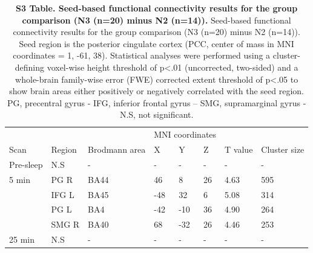 \begin{table}[htbp]
    \caption*{\textbf{S3 Table. Seed-based functional connectivity results for the group comparison (N3 (n=20) minus N2 (n=14)).} Seed-based functional connectivity results for the group comparison (N3 (n=20) minus N2 (n=14)). Seed region is the posterior cingulate cortex (PCC, center of mass in MNI coordinates = 1, -61, 38). Statistical analyses were performed using a cluster-defining voxel-wise height threshold of p<.01 (uncorrected, two-sided) and a whole-brain family-wise error (FWE) corrected extent threshold of p<.05 to show brain areas either positively or negatively correlated with the seed region. PG, precentral gyrus - IFG, inferior frontal gyrus – SMG, supramarginal gyrus - N.S, not significant.}
    \begin{tabularx}{\textwidth}{lXXllllX}
    \toprule
    &         &                 & \multicolumn{3}{c}{MNI coordinates}                 &              &              \\
    Scan      & Region    		& Brodmann area & X          & Y          & Z         & T value 		& Cluster size \\ \midrule
    Pre-sleep & N.S 			& -             & -          & -          & -         & -            & -            \\
    5 min     & PG R 			& BA44          & 46         & 8          & 26        & 4.63         & 595          \\
              & IFG L           & BA45          & -48        & 32         & 6         & 5.08         & 314          \\
              & PG L 			& BA4           & -42        & -10        & 36        & 4.90         & 264          \\
              & SMG R           & BA40          & 68         & -32        & 26        & 4.46         & 253          \\
    25 min    & N.S & -         & -          & -          & -         & -            & -            \\ \toprule
    \end{tabularx}%
\end{table}
